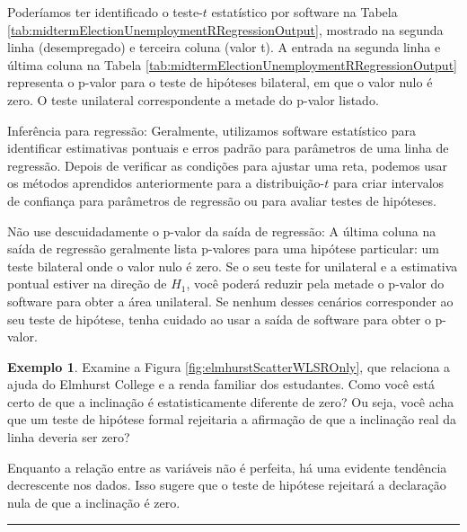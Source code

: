 \documentclass[
]{book}
\theoremstyle{definition}
\theoremstyle{definition}
\newtheorem{example}{Exemplo}[chapter]
\theoremstyle{definition}
\theoremstyle{definition}
\theoremstyle{remark}
\begin{document}
Poderíamos ter identificado o teste-\(t\) estatístico por software na Tabela \ref{tab:midtermElectionUnemploymentRRegressionOutput}, mostrado na segunda linha (desempregado) e terceira coluna (valor t). A entrada na segunda linha e última coluna na Tabela \ref{tab:midtermElectionUnemploymentRRegressionOutput} representa o p-valor para o teste de hipóteses bilateral, em que o valor nulo é zero. O teste unilateral correspondente a metade do p-valor listado.

Inferência para regressão: Geralmente, utilizamos software estatístico para identificar estimativas pontuais e erros padrão para parâmetros de uma linha de regressão. Depois de verificar as condições para ajustar uma reta, podemos usar os métodos aprendidos anteriormente para a distribuição-\(t\) para criar intervalos de confiança para parâmetros de regressão ou para avaliar testes de hipóteses.

Não use descuidadamente o p-valor da saída de regressão: A última coluna na saída de regressão geralmente lista p-valores para uma hipótese particular: um teste bilateral onde o valor nulo é zero. Se o seu teste for unilateral e a estimativa pontual estiver na direção de \(H_1\), você poderá reduzir pela metade o p-valor do software para obter a área unilateral. Se nenhum desses cenários corresponder ao seu teste de hipótese, tenha cuidado ao usar a saída de software para obter o p-valor.

\begin{example}
\protect\hypertarget{exm:overallAidIncomeInformalAssessmentOfRegressionLineSlope}{}{\label{exm:overallAidIncomeInformalAssessmentOfRegressionLineSlope} }Examine a Figura \ref{fig:elmhurstScatterWLSROnly}, que relaciona a ajuda do Elmhurst College e a renda familiar dos estudantes. Como você está certo de que a inclinação é estatisticamente diferente de zero? Ou seja, você acha que um teste de hipótese formal rejeitaria a afirmação de que a inclinação real da linha deveria ser zero?
\end{example}

Enquanto a relação entre as variáveis não é perfeita, há uma evidente tendência decrescente nos dados. Isso sugere que o teste de hipótese rejeitará a declaração nula de que a inclinação é zero.

\begin{center}\rule{0.5\linewidth}{0.5pt}\end{center}
\end{document}

